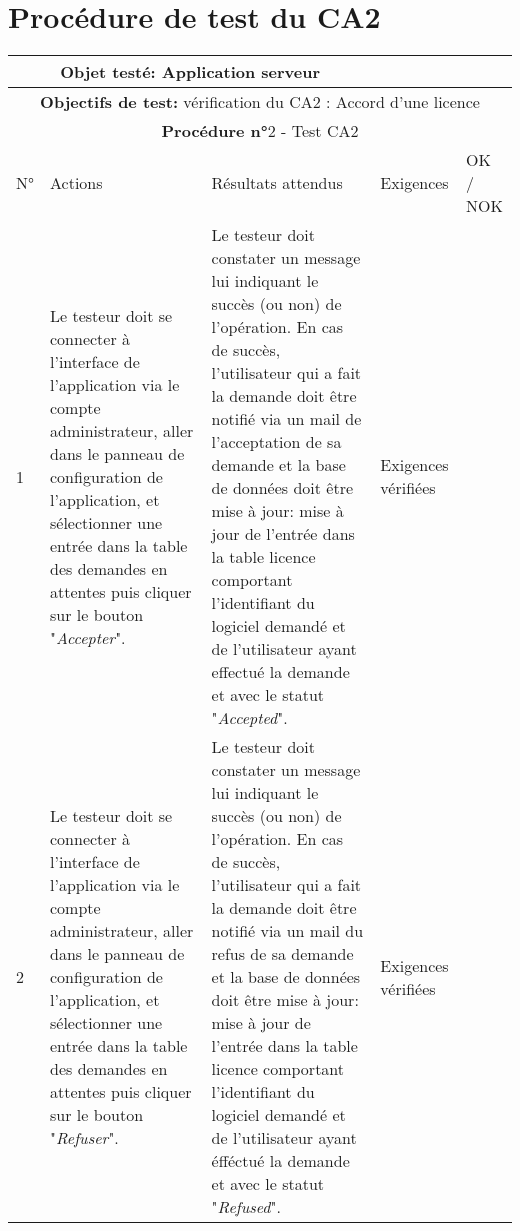 \section*{Procédure de test du CA2}
\begin{table}[!h]
        \centering
        \begin{tabular}{|m{0.6cm}|
                         >{\raggedright\arraybackslash}m{4cm}|
                         >{\raggedright\arraybackslash}m{6.4cm}|
                         >{\raggedright\arraybackslash}m{2cm}|
                         m{1cm}|}
            \hline
            \multicolumn{3}{|c|}{
                \textbf{Objet testé: } Application serveur
            } & \multicolumn{2}{|c|}{
                \textbf{Version: } version
            } \\
            \hline
            \multicolumn{5}{|c|}{\textbf{Objectifs de test:} 
                vérification du CA2 : Accord d'une licence }\\
            \hline
            \multicolumn{5}{|c|}{
                \textbf{Procédure n°}2 - Test CA2
            } \\
            \hline
            N° & Actions & Résultats attendus & Exigences & OK / NOK \\
            \hline      %
            1 & Le testeur doit se connecter à l'interface de l'application
                via le compte administrateur, aller dans le panneau de configuration
                de l'application, et sélectionner une entrée dans la table des demandes 
                en attentes puis cliquer sur le bouton "\emph{Accepter}". 
              & Le testeur doit constater un message lui indiquant le succès (ou non)
                de l'opération. En cas de succès, l'utilisateur qui a fait la demande 
                doit être notifié via un mail de l'acceptation de sa demande et la 
                base de données doit être mise à jour: mise à jour de l'entrée dans 
                la table licence comportant l'identifiant du logiciel demandé et de l'utilisateur 
                ayant effectué la demande et avec le statut "\emph{Accepted}".
              & Exigences vérifiées & \\
            \hline
            2 & Le testeur doit se connecter à l'interface de l'application
                via le compte administrateur, aller dans le panneau de configuration
                de l'application, et sélectionner une entrée dans la table des demandes 
                en attentes puis cliquer sur le bouton "\emph{Refuser}". 
              & Le testeur doit constater un message lui indiquant le succès (ou non)
                de l'opération. En cas de succès, l'utilisateur qui a fait la demande 
                doit être notifié via un mail du refus de sa demande et la 
                base de données doit être mise à jour: mise à jour de l'entrée dans 
                la table licence comportant l'identifiant du logiciel demandé et de l'utilisateur 
                ayant éfféctué la demande et avec le statut "\emph{Refused}".
              & Exigences vérifiées & \\
            \hline
        \end{tabular} 
        \label{tab:tab2}
\end{table}
